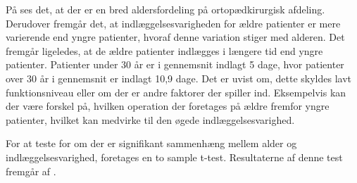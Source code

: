 \noindent
På  ses det, at der er en bred aldersfordeling på ortopædkirurgisk afdeling. Derudover fremgår det, at indlæggelsesvarigheden for ældre patienter er mere varierende end yngre patienter, hvoraf denne variation stiger med alderen. Det fremgår ligeledes, at de ældre patienter indlægges i længere tid end yngre patienter. Patienter under $30$ år er i gennemsnit indlagt 5 dage, hvor patienter over $30$ år i gennemsnit er indlagt 10,9 dage. Det er uvist om, dette skyldes lavt funktionsniveau eller om der er andre faktorer der spiller ind. Eksempelvis kan der være forskel på, hvilken operation der foretages på ældre fremfor yngre patienter, hvilket kan medvirke til den øgede indlæggelsesvarighed.

For at teste for om der er signifikant sammenhæng mellem alder og indlæggelsesvarighed, foretages en to sample t-test. Resultaterne af denne test fremgår af .


